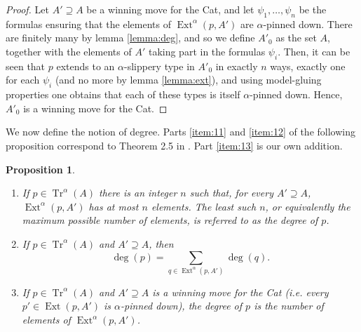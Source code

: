 \documentclass{article}
\newtheorem{prop}[theorem]{Proposition}
\theoremstyle{nonumberplain}
\newtheorem{proof}{Proof}
\DeclareMathOperator{\Tr}{Tr}
\DeclareMathOperator{\Ext}{Ext}
\begin{document}
\begin{proof}
Let $A' \supseteq A$ be a winning move for the Cat, and let $\psi_1, \dots, \psi_n$ be the formulas ensuring that the elements of $\Ext^\alpha(p,A')$ are $\alpha$-pinned down. There are finitely many by lemma \ref{lemma:deg}, and so we define $A'_0$ as the set $A$, together with the elements of $A'$ taking part in the formulas $\psi_i$. Then, it can be seen that $p$ extends to an $\alpha$-slippery type in $A'_0$ in exactly $n$ ways, exactly one for each $\psi_i$ (and no more by lemma \ref{lemma:ext}), and using model-gluing properties one obtains that each of these types is itself $\alpha$-pinned down. Hence, $A'_0$ is a winning move for the Cat.
\end{proof}

We now define the notion of degree. Parts \ref{item:11} and \ref{item:12} of the following proposition correspond to Theorem 2.5 in \cite{morley}. Part \ref{item:13} is our own addition.

\begin{prop}
\begin{enumerate}
\item\label{item:11} If $p \in \Tr^\alpha(A)$ there is an integer $n$ such that, for every $A' \supseteq A$, $\Ext^\alpha(p,A')$ has at most $n$ elements. The least such $n$, or equivalently the maximum possible number of elements, is referred to as the \emph{degree of $p$}.

\item\label{item:12} If $p \in \Tr^\alpha(A)$ and $A' \supseteq A$, then
\begin{equation}\label{eq:deg}
\deg(p) = \sum_{q \in \Ext^\alpha(p,A')} \deg(q).
\end{equation}

\item\label{item:13} If $p \in \Tr^\alpha(A)$ and $A' \supseteq A$ is a winning move for the Cat (i.e. every $p' \in \Ext(p,A')$ is $\alpha$-pinned down), the degree of $p$ is the number of elements of $\Ext^\alpha(p,A')$.
\end{enumerate}
\end{prop}
\end{document}
